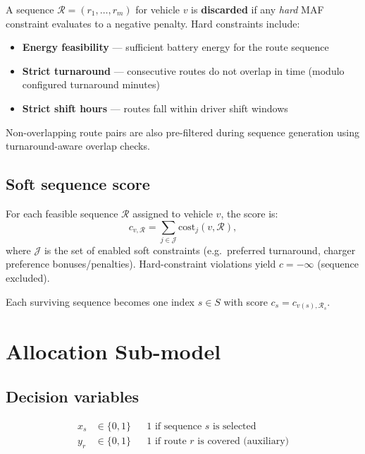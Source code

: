 \documentclass[11pt,a4paper]{article}
\newcommand{\1}{\mathbf{1}}
\begin{document}
A sequence $\mathcal{R} = (r_1,\ldots,r_m)$ for vehicle $v$ is \textbf{discarded} if any
\emph{hard} MAF constraint evaluates to a negative penalty. Hard constraints include:
\begin{itemize}[nosep]
  \item \textbf{Energy feasibility} --- sufficient battery energy for the route sequence
  \item \textbf{Strict turnaround} --- consecutive routes do not overlap in time
        (modulo configured turnaround minutes)
  \item \textbf{Strict shift hours} --- routes fall within driver shift windows
\end{itemize}

Non-overlapping route pairs are also pre-filtered during sequence generation using
turnaround-aware overlap checks.

\subsection{Soft sequence score}

For each feasible sequence $\mathcal{R}$ assigned to vehicle $v$, the score is:
\begin{equation}
  \label{eq:sequence-score}
  c_{v,\mathcal{R}} = \sum_{j \in \mathcal{J}} \mathrm{cost}_j(v, \mathcal{R}),
\end{equation}
where $\mathcal{J}$ is the set of enabled soft constraints (e.g.\ preferred turnaround,
charger preference bonuses/penalties). Hard-constraint violations yield
$c = -\infty$ (sequence excluded).

Each surviving sequence becomes one index $s \in S$ with score $c_s = c_{v(s),\mathcal{R}_s}$.

\section{Allocation Sub-model}

\subsection{Decision variables}

\begin{align}
  x_s &\in \{0,1\} && \text{1 if sequence $s$ is selected} \\
  y_r &\in \{0,1\} && \text{1 if route $r$ is covered (auxiliary)}
\end{align}
\end{document}
